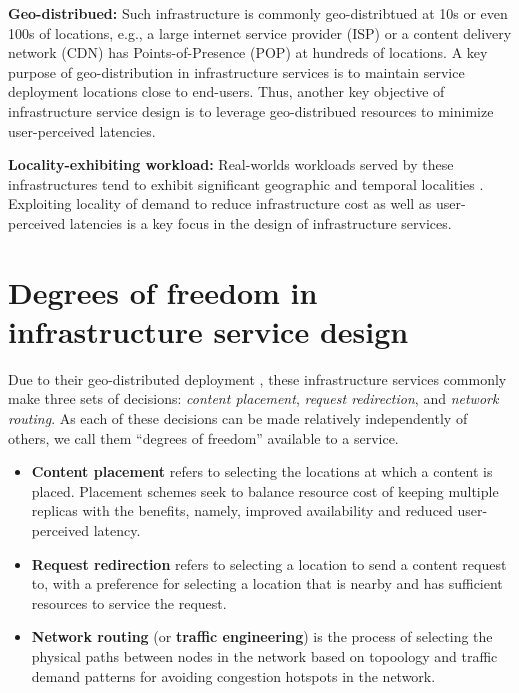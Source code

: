 \textbf{Geo-distribued:} Such infrastructure is commonly geo-distribtued at 10s or even 100s of locations, e.g., a large internet service provider (ISP) or a content delivery network (CDN) has Points-of-Presence (POP) at hundreds of locations. A key purpose of geo-distribution in infrastructure services is to maintain service deployment locations close to end-users. Thus, another key objective of infrastructure service design is to leverage geo-distribued resources to minimize user-perceived latencies.

\textbf{Locality-exhibiting workload:} Real-worlds workloads served by these infrastructures tend to exhibit significant geographic and temporal localities \cite{NCDN, youtubeUGC, vodP2Pbenefit, cellularvideotraffic}. Exploiting locality of demand to reduce infrastructure cost as well as user-perceived latencies is a key focus in the design of infrastructure services.


\section{Degrees of freedom in infrastructure service design} Due to their geo-distributed deployment \cite{dilley2002globally}, these infrastructure services commonly make three sets of decisions: \emph{content placement}, \emph{request redirection}, and \emph{network routing}. As each of these decisions can be made relatively independently of others, we call them ``degrees of freedom'' available to a service. 
\begin{itemize}
	\item
	\textbf{Content placement} refers to selecting the locations at which a content is placed. Placement schemes seek to balance resource cost of keeping multiple replicas with the benefits, namely, improved availability and reduced user-perceived latency.
	\item
	 \textbf{Request redirection} refers to selecting a location to send a content request to, with a preference for selecting a location that is nearby and has sufficient resources to service the request.
	\item
	 \textbf{Network routing} (or \textbf{traffic engineering}) is the process of selecting the physical paths between nodes in the network based on topoology and traffic demand patterns for avoiding congestion hotspots in the network.
\end{itemize}


